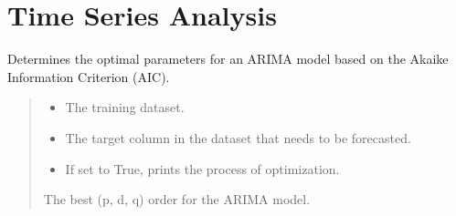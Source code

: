 \documentclass[letterpaper,10pt,english]{sphinxmanual}
\begin{document}
\sphinxstepscope


\section{Time Series Analysis}
\label{\detokenize{docs/time_series_analysis:time-series-analysis}}\label{\detokenize{docs/time_series_analysis::doc}}\label{\detokenize{docs/time_series_analysis:module-time_series_analysis}}

\begin{fulllineitems}
\label{\detokenize{docs/time_series_analysis:time_series_analysis.ARIMA_optimizer}}
\pysigstartsignatures
{}
\pysigstopsignatures
\sphinxAtStartPar
Determines the optimal parameters for an ARIMA model based on the Akaike Information Criterion (AIC).
\begin{quote}\begin{description}
\begin{itemize}
\item {} 
\sphinxAtStartPar
{} \textendash{} The training dataset.

\item {} 
\sphinxAtStartPar
{} \textendash{} The target column in the dataset that needs to be forecasted.

\item {} 
\sphinxAtStartPar
{} \textendash{} If set to True, prints the process of optimization.

\end{itemize}

\sphinxAtStartPar
The best (p, d, q) order for the ARIMA model.

\end{description}\end{quote}

\end{fulllineitems}
\end{document}
